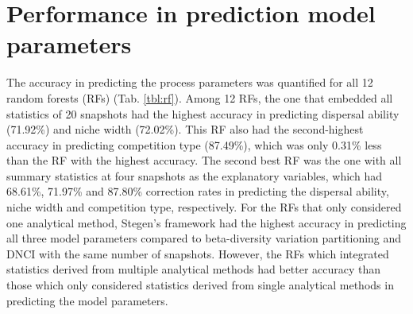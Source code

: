 	
	
	\section{Performance in prediction model parameters}
	\noindent
	The accuracy in predicting the process parameters was quantified for all 12 random forests (RFs) (Tab. \ref{tbl:rf}). Among 12 RFs, the one that embedded all statistics of 20 snapshots had the highest accuracy in predicting dispersal ability (71.92\%) and niche width (72.02\%). This RF also had the second-highest accuracy in predicting competition type (87.49\%), which was only 0.31\% less than the RF with the highest accuracy. The second best RF was the one with all summary statistics at four snapshots as the explanatory variables, which had 68.61\%, 71.97\% and 87.80\% correction rates in predicting the dispersal ability, niche width and competition type, respectively. For the RFs that only considered one analytical method, Stegen's framework had the highest accuracy in predicting all three model parameters compared to beta-diversity variation partitioning and DNCI with the same number of snapshots. However, the RFs which integrated statistics derived from multiple analytical methods had better accuracy than those which only considered statistics derived from single analytical methods in predicting the model parameters.
	
